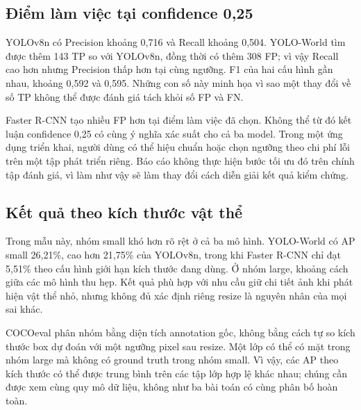 \subsection{Điểm làm việc tại confidence 0,25}
\begin{table}[H]\centering\small
\caption{Số đếm và P/R/F1 micro tại confidence 0,25, IoU 0,50}

\label{tab:operating}
\end{table}
YOLOv8n có Precision khoảng 0,716 và Recall khoảng 0,504. YOLO-World tìm được thêm 143 TP so với YOLOv8n, đồng thời có thêm 308 FP; vì vậy Recall cao hơn nhưng Precision thấp hơn tại cùng ngưỡng. F1 của hai cấu hình gần nhau, khoảng 0,592 và 0,595. Những con số này minh họa vì sao một thay đổi về số TP không thể được đánh giá tách khỏi số FP và FN.

Faster R-CNN tạo nhiều FP hơn tại điểm làm việc đã chọn. Không thể từ đó kết luận confidence 0,25 có cùng ý nghĩa xác suất cho cả ba model. Trong một ứng dụng triển khai, người dùng có thể hiệu chuẩn hoặc chọn ngưỡng theo chi phí lỗi trên một tập phát triển riêng. Báo cáo không thực hiện bước tối ưu đó trên chính tập đánh giá, vì làm như vậy sẽ làm thay đổi cách diễn giải kết quả kiểm chứng.

\subsection{Kết quả theo kích thước vật thể}
\begin{table}[H]\centering
\caption{AP theo các nhóm kích thước của COCOeval}

\label{tab:sizeap}
\end{table}
Trong mẫu này, nhóm small khó hơn rõ rệt ở cả ba mô hình. YOLO-World có AP small 26,21\%, cao hơn 21,75\% của YOLOv8n, trong khi Faster R-CNN chỉ đạt 5,51\% theo cấu hình giới hạn kích thước đang dùng. Ở nhóm large, khoảng cách giữa các mô hình thu hẹp. Kết quả phù hợp với nhu cầu giữ chi tiết ảnh khi phát hiện vật thể nhỏ, nhưng không đủ xác định riêng resize là nguyên nhân của mọi sai khác.

COCOeval phân nhóm bằng diện tích annotation gốc, không bằng cách tự so kích thước box dự đoán với một ngưỡng pixel sau resize. Một lớp có thể có mặt trong nhóm large mà không có ground truth trong nhóm small. Vì vậy, các AP theo kích thước có thể được trung bình trên các tập lớp hợp lệ khác nhau; chúng cần được xem cùng quy mô dữ liệu, không như ba bài toán có cùng phân bố hoàn toàn.

